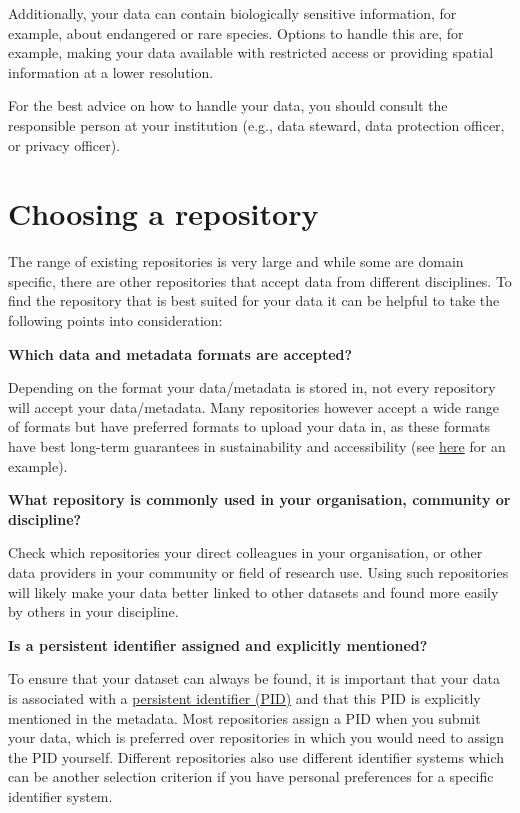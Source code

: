 \documentclass[
]{book}
\begin{document}
Additionally, your data can contain biologically sensitive information, for example, about endangered or rare species. Options to handle this are, for example, making your data available with restricted access or providing spatial information at a lower resolution.

For the best advice on how to handle your data, you should consult the responsible person at your institution (e.g., data steward, data protection officer, or privacy officer).

\hypertarget{choosing-a-repository}{%
\section{Choosing a repository}\label{choosing-a-repository}}

The range of existing repositories is very large and while some are domain specific, there are other repositories that accept data from different disciplines. To find the repository that is best suited for your data it can be helpful to take the following points into consideration:

\textbf{Which data and metadata formats are accepted?}

Depending on the format your data/metadata is stored in, not every repository will accept your data/metadata. Many repositories however accept a wide range of formats but have preferred formats to upload your data in, as these formats have best long-term guarantees in sustainability and accessibility (see \href{https://dans.knaw.nl/en/file-formats/}{here} for an example).

\textbf{What repository is commonly used in your organisation, community or discipline? }

Check which repositories your direct colleagues in your organisation, or other data providers in your community or field of research use. Using such repositories will likely make your data better linked to other datasets and found more easily by others in your discipline.

\textbf{Is a persistent identifier assigned and explicitly mentioned?}

To ensure that your dataset can always be found, it is important that your data is associated with a \protect\hyperlink{PID}{persistent identifier (PID)} and that this PID is explicitly mentioned in the metadata. Most repositories assign a PID when you submit your data, which is preferred over repositories in which you would need to assign the PID yourself. Different repositories also use different identifier systems which can be another selection criterion if you have personal preferences for a specific identifier system.
\end{document}
